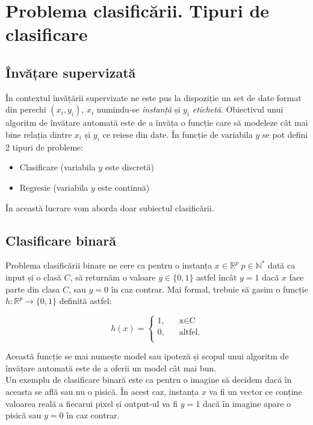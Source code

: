 \documentclass[11pt]{article}
\begin{document}
\section{Problema clasificării. Tipuri de clasificare}
\subsection{Învățare supervizată}
În contextul învățării supervizate ne este pus la dispoziție un set de date format din perechi $(x_i, y_i)$, $x_i$ numindu-se \textit{instanță} și $y_i$ \textit{etichetă}. Obiectivul unui algoritm de învățare automată este de a învăța o funcție care să modeleze cât mai bine relația dintre $x_i$ și $y_i$ ce reiese din date. În funcție de variabila $y$ se pot defini 2 tipuri de probleme:

\begin{itemize}
\item Clasificare (variabila $y$ este discretă)
\item Regresie (variabila $y$ este continuă)
\end{itemize}

În această lucrare vom aborda doar subiectul clasificării.

\subsection{Clasificare binară}
Problema clasificării binare ne cere ca pentru o instanța $x\in\mathbb{R}^p \; p\in\mathbb{N^*}$  dată ca input și o clasă $C$, să returnăm o valoare $y\in\{0, 1\}$ astfel încât $y=1$ dacă $x$ face parte din clasa $C$, sau $y=0$ în caz contrar. Mai formal, trebuie să gasim o funcție $h:\mathbb{R}^p\rightarrow\{0, 1\}$ definită astfel: 

\[
h(x)=
	\begin{cases}
		\text{1,} &\quad\text{x}\in\text{C} \\
		\text{0,} &\quad\text{altfel.} \\
	\end{cases}
\]

Această funcție se mai numește model sau ipoteză și scopul unui algoritm de învățare automată este de a oferii un model cât mai bun.\\
Un exemplu de clasificare binară este ca pentru o imagine să decidem dacă în aceasta se află sau nu o pisică. În acest caz, instanța $x$ va fi un vector ce conține valoarea reală a fiecarui pixel și output-ul va fi $y=1$ dacă în imagine apare o pisică sau $y=0$ în caz contrar.
\end{document}
